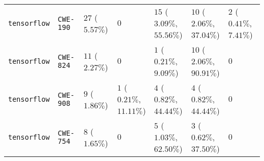 \begin{table}
\begin{tabular}{lllllll}
\texttt{tensorflow} & \texttt{CWE-190} & $27$ ($5.57\%$) & $0$ & $15$ ($3.09\%$, $55.56\%$) & $10$ ($2.06\%$, $37.04\%$) & $2$ ($0.41\%$, $7.41\%$) \\
\texttt{tensorflow} & \texttt{CWE-824} & $11$ ($2.27\%$) & $0$ & $1$ ($0.21\%$, $9.09\%$) & $10$ ($2.06\%$, $90.91\%$) & $0$ \\
\texttt{tensorflow} & \texttt{CWE-908} & $9$ ($1.86\%$) & $1$ ($0.21\%$, $11.11\%$) & $4$ ($0.82\%$, $44.44\%$) & $4$ ($0.82\%$, $44.44\%$) & $0$ \\
\texttt{tensorflow} & \texttt{CWE-754} & $8$ ($1.65\%$) & $0$ & $5$ ($1.03\%$, $62.50\%$) & $3$ ($0.62\%$, $37.50\%$) & $0$ \\
\bottomrule
\end{tabular}
\end{table}
